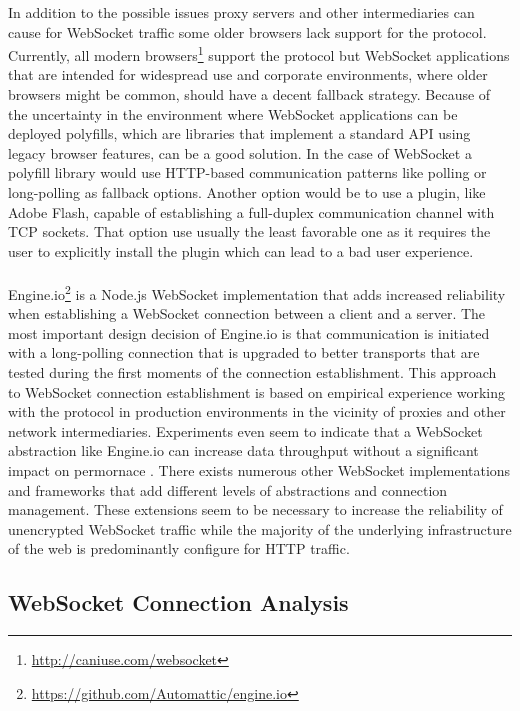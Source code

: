 In addition to the possible issues proxy servers and other intermediaries can cause for WebSocket traffic some older browsers lack support for the protocol. Currently, all modern browsers\footnote{\url{http://caniuse.com/websocket}} support the protocol but WebSocket applications that are intended for widespread use and corporate environments, where older browsers might be common, should have a decent fallback strategy. Because of the uncertainty in the environment where WebSocket applications can be deployed polyfills, which are libraries that implement a standard API using legacy browser features, can be a good solution. In the case of WebSocket a polyfill library would use HTTP-based communication patterns like polling or long-polling as fallback options. Another option would be to use a plugin, like Adobe Flash, capable of establishing a full-duplex communication channel with TCP sockets. That option use usually the least favorable one as it requires the user to explicitly install the plugin which can lead to a bad user experience.
\\ \\
Engine.io\footnote{\url{https://github.com/Automattic/engine.io}} is a Node.js WebSocket implementation that adds increased reliability when establishing a WebSocket connection between a client and a server. The most important design decision of Engine.io is that communication is initiated with a long-polling connection that is upgraded to better transports that are tested during the first moments of the connection establishment. This approach to WebSocket connection establishment is based on empirical experience working with the protocol in production environments in the vicinity of proxies and other network intermediaries. Experiments even seem to indicate that a WebSocket abstraction like Engine.io can increase data throughput without a significant impact on permornace \cite{ozger2014websocket}. There exists numerous other WebSocket implementations and frameworks that add different levels of abstractions and connection management. These extensions seem to be necessary to increase the reliability of unencrypted WebSocket traffic while the majority of the underlying infrastructure of the web is predominantly configure for HTTP traffic.

\subsection{WebSocket Connection Analysis}


